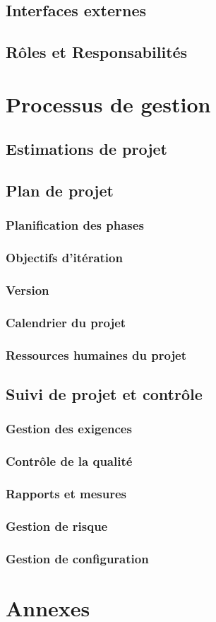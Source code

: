 \documentclass[a4paper,10pt,twoside]{article}
\begin{document}
\subsection{Interfaces externes}
\subsection{Rôles et Responsabilités}
\section{Processus de gestion}
\subsection{Estimations de projet}
\subsection{Plan de projet}
\subsubsection{Planification des phases}
\subsubsection{Objectifs d’itération}
\subsubsection{Version}
\subsubsection{Calendrier du projet}
\subsubsection{Ressources humaines du projet}
\subsection{Suivi de projet et contrôle}
\subsubsection{Gestion des exigences}
\subsubsection{Contrôle de la qualité}
\subsubsection{Rapports et mesures}
\subsubsection{Gestion de risque}
\subsubsection{Gestion de configuration}
\section{Annexes}
\end{document}
